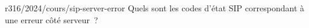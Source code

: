 \begin{question}{r316/2024/cours/sip-server-error}
  Quels sont les codes d'état SIP correspondant à une erreur côté serveur~?
  \begin{reponses}
  \end{reponses}
\end{question}
